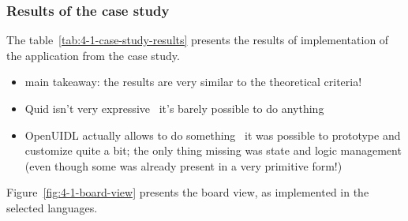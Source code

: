 \subsubsection{Results of the case study}

The table~\ref{tab:4-1-case-study-results} presents the results of implementation of the application from the case study.
\begin{itemize}
    \item main takeaway: the results are very similar to the theoretical criteria!
    \item Quid isn't very expressive \textendash\ it's barely possible to do anything
    \item OpenUIDL actually allows to do something \textendash\  it was possible to prototype and customize quite a bit; the only thing missing was state and logic management (even though some was already present in a very primitive form!)
\end{itemize}
Figure~\ref{fig:4-1-board-view} presents the board view, as implemented in the selected languages.

